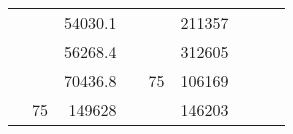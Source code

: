 \begin{table}[H]
\begin{tabular}{|ccrccrccc}
\multicolumn{1}{|c|}{\cellcolor[HTML]{FFFFC7}}                                & \multicolumn{1}{c|}{\cellcolor[HTML]{DAE8FC}}                      & \multicolumn{1}{r|}{\cellcolor[HTML]{DAE8FC}54030.1}   & \multicolumn{1}{c|}{\cellcolor[HTML]{FFFFC7}}                                & \multicolumn{1}{c|}{\cellcolor[HTML]{DAE8FC}}                       & \multicolumn{1}{r|}{\cellcolor[HTML]{DDFDFF}211357}    &                                                                              &                                                                    &                                                        \\ \cline{3-3} \cline{6-6}
\multicolumn{1}{|c|}{\cellcolor[HTML]{FFFFC7}}                                & \multicolumn{1}{c|}{\cellcolor[HTML]{DAE8FC}}                      & \multicolumn{1}{r|}{\cellcolor[HTML]{DDFDFF}56268.4}   & \multicolumn{1}{c|}{\cellcolor[HTML]{FFFFC7}}                                & \multicolumn{1}{c|}{\cellcolor[HTML]{DAE8FC}}                       & \multicolumn{1}{r|}{\cellcolor[HTML]{DAE8FC}312605}    &                                                                              &                                                                    &                                                        \\ \cline{3-3} \cline{6-6}
\multicolumn{1}{|c|}{\cellcolor[HTML]{FFFFC7}}                                & \multicolumn{1}{c|}{\cellcolor[HTML]{DAE8FC}}                      & \multicolumn{1}{r|}{\cellcolor[HTML]{DAE8FC}70436.8}   & \multicolumn{1}{c|}{\cellcolor[HTML]{FFFFC7}}                                & \multicolumn{1}{c|}{\multirow{-10}{*}{\cellcolor[HTML]{DAE8FC}75}}  & \multicolumn{1}{r|}{\cellcolor[HTML]{DDFDFF}106169}    &                                                                              &                                                                    &                                                        \\ \cline{3-3} \cline{5-6}
\multicolumn{1}{|c|}{\cellcolor[HTML]{FFFFC7}}                                & \multicolumn{1}{c|}{\multirow{-10}{*}{\cellcolor[HTML]{DAE8FC}75}} & \multicolumn{1}{r|}{\cellcolor[HTML]{DDFDFF}149628}    & \multicolumn{1}{c|}{\cellcolor[HTML]{FFFFC7}}                                & \multicolumn{1}{c|}{\cellcolor[HTML]{DDFDFF}}                       & \multicolumn{1}{r|}{\cellcolor[HTML]{DAE8FC}146203}    &                                                                              &                                                                    &                                                        \\ \cline{2-3} \cline{6-6}

\end{tabular}
\end{table}
